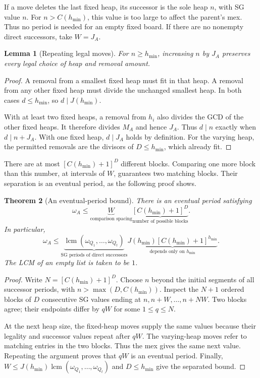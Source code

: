 \documentclass[11pt]{article}
\newtheorem{theorem}{Theorem}[section]
\newtheorem{lemma}[theorem]{Lemma}
\begin{document}
If a move deletes the last fixed heap, its successor is the sole
heap $n$, with SG value $n$. For $n>C(h_{\min})$, this value is
too large to affect the parent's mex. Thus no period is needed
for an empty fixed board. If there are no nonempty direct
successors, take $W=J_A$.

\begin{lemma}[Repeating legal moves]
\label{lem:legality}
For $n\ge h_{\min}$, increasing $n$ by $J_A$ preserves every
legal choice of heap and removal amount.
\end{lemma}
\begin{proof}
A removal from a smallest fixed heap must fit in that heap.
A removal from any other fixed heap must divide the unchanged
smallest heap. In both cases $d\le h_{\min}$, so
$d\mid J(h_{\min})$.

With at least two fixed heaps, a removal from $h_i$ also divides
the GCD of the other fixed heaps. It therefore divides $M_A$
and hence $J_A$. Thus $d\mid n$ exactly when $d\mid n+J_A$.
With one fixed heap, $d\mid J_A$ holds by definition.
For the varying heap, the permitted removals are the divisors
of $D\le h_{\min}$, which already fit.
\end{proof}

There are at most $[C(h_{\min})+1]^D$ different blocks.
Comparing one more block than this number, at intervals of
$W$, guarantees two matching blocks. Their separation is an
eventual period, as the following proof shows.

\begin{theorem}[An eventual-period bound]
\label{thm:period}
There is an eventual period satisfying
\begin{equation}
 \boxed{\omega_A\le
 \underbrace{W}_{\text{comparison spacing}}
 \underbrace{[C(h_{\min})+1]^D}_{\text{number of possible blocks}}.}
 \label{eq:periodfine}
\end{equation}
In particular,
\begin{equation}
 \boxed{\omega_A\le
 \underbrace{\operatorname{lcm}(\omega_{Q_1},\ldots,\omega_{Q_t})}_{
 \text{SG periods of direct successors}}
 \underbrace{J(h_{\min})[C(h_{\min})+1]^{h_{\min}}}_{
 \text{depends only on }h_{\min}}.}
 \label{eq:periodseparated}
\end{equation}
The LCM of an empty list is taken to be $1$.
\end{theorem}
\begin{proof}
Write $N=[C(h_{\min})+1]^D$. Choose $n$ beyond the initial
segments of all successor periods, with $n>\max(D,C(h_{\min}))$.
Inspect the $N+1$ ordered blocks of $D$ consecutive SG values
ending at $n,n+W,\ldots,n+NW$. Two blocks agree; their endpoints
differ by $qW$ for some $1\le q\le N$.

At the next heap size, the fixed-heap moves supply the same values
because their legality and successor values repeat after $qW$.
The varying-heap moves refer to matching entries in the two blocks.
Thus the mex gives the same next value. Repeating the argument
proves that $qW$ is an eventual period. Finally,
$W\le J(h_{\min})\operatorname{lcm}(\omega_{Q_1},\ldots,\omega_{Q_t})$
and $D\le h_{\min}$ give the separated bound.
\end{proof}
\end{document}
